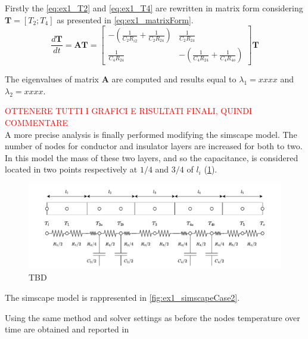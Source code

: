 \documentclass[11pt,a4paper,oneside]{article}
\renewcommand{\vec}[1]{\mathbf{#1}}
\newcommand{\tr}{\textcolor{red}}
\begin{document}
Firstly the \cref{eq:ex1_T2} and \cref{eq:ex1_T4} are rewritten in matrix form considering $\vec{T}=[T_2;T_4]$ as presented in \cref{eq:ex1_matrixForm}.
\begin{equation}
    \frac{d \vec{T}}{dt} = \vec{A} \vec{T} =    \left[
    \begin{array}{cc}
        -\left( \frac{1}{C_2 R_{i2}} + \frac{1}{C_2 R_{24}} \right) & \frac{1}{C_2 R_{24}} \\
        \frac{1}{C_4 R_{24}} & -\left( \frac{1}{C_4 R_{24}} + \frac{1}{C_4 R_{4o}} \right)
    \end{array}                                 \right] \vec{T}
    \label{eq:ex1_matrixForm}
\end{equation}

The eigenvalues of matrix $\vec{A}$ are computed and results equal to $\lambda_1=xxxx$ and $\lambda_2=xxxx$.

\tr{OTTENERE TUTTI I GRAFICI E RISULTATI FINALI, QUINDI COMMENTARE}
\\

A more precise analysis is finally performed modifying the simscape model.
The number of nodes for conductor and insulator layers are increased for both to two.
In this model the mass of these two layers, and so the capacitance, is considered located in two points respectively at $1/4$ and $3/4$ of $l_i$ (\cref{fig:phyModelCase2}).
\begin{figure}[htb]
    \centering
    \includegraphics*[width=1\textwidth, keepaspectratio]{Figures/phyModelCase2.pdf}
    \caption[]{\label{fig:phyModelCase2} TBD}
\end{figure}

The simscape model is rappresented in \cref{fig:ex1_simscapeCase2}.

Using the same method and solver settings as before the nodes temperature over time are obtained and reported in %
\end{document}
